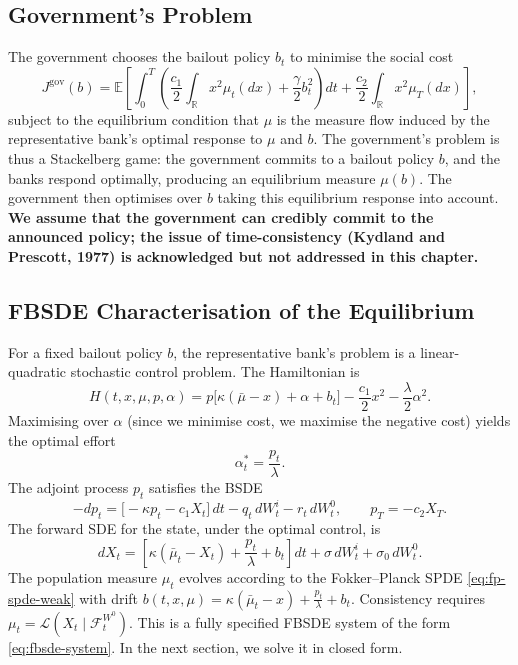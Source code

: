 \subsection{Government's Problem}

The government chooses the bailout policy $b_t$ to minimise the social cost
\begin{equation}
    J^{\mathrm{gov}}(b) = \mathbb{E}\left[ \int_0^T \left( \frac{c_1}{2}
    \int_{\mathbb{R}} x^2 \mu_t(dx) + \frac{\gamma}{2} b_t^2 \right) dt +
    \frac{c_2}{2} \int_{\mathbb{R}} x^2 \mu_T(dx) \right],
    \label{eq:sr-gov-objective}
\end{equation}
subject to the equilibrium condition that $\mu$ is the measure flow induced by the
representative bank's optimal response to $\mu$ and $b$. The government's problem is
thus a Stackelberg game: the government commits to a bailout policy $b$, and the
banks respond optimally, producing an equilibrium measure $\mu(b)$. The government
then optimises over $b$ taking this equilibrium response into account. \textbf{We
assume that the government can credibly commit to the announced policy; the issue of
time-consistency (Kydland and Prescott, 1977) is acknowledged but not addressed in
this chapter.}

\subsection{FBSDE Characterisation of the Equilibrium}

For a fixed bailout policy $b$, the representative bank's problem is a
linear-quadratic stochastic control problem. The Hamiltonian is
\[
    H(t,x,\mu,p,\alpha) = p\big[\kappa(\bar\mu - x) + \alpha + b_t\big] -
    \frac{c_1}{2}x^2 - \frac{\lambda}{2}\alpha^2.
\]
Maximising over $\alpha$ (since we minimise cost, we maximise the negative cost)
yields the optimal effort
\begin{equation}
    \alpha_t^* = \frac{p_t}{\lambda}.
    \label{eq:sr-optimal-effort}
\end{equation}
The adjoint process $p_t$ satisfies the BSDE
\begin{equation}
    -dp_t = \big[ -\kappa p_t - c_1 X_t \big]\, dt - q_t\, dW_t^i - r_t\, dW_t^0,
    \qquad p_T = -c_2 X_T.
    \label{eq:sr-adjoint-bsde}
\end{equation}
The forward SDE for the state, under the optimal control, is
\[
    dX_t = \left[ \kappa(\bar\mu_t - X_t) + \frac{p_t}{\lambda} + b_t \right] dt +
    \sigma\, dW_t^i + \sigma_0\, dW_t^0.
\]
The population measure $\mu_t$ evolves according to the Fokker--Planck SPDE
\eqref{eq:fp-spde-weak} with drift $b(t,x,\mu) = \kappa(\bar\mu_t - x) +
\tfrac{p_t}{\lambda} + b_t$. Consistency requires
$\mu_t = \mathcal{L}(X_t \mid \mathcal{F}_t^{W^0})$. This is a fully specified FBSDE
system of the form \eqref{eq:fbsde-system}. In the next section, we solve it in
closed form.


